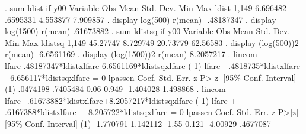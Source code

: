 . sum ldist if y00
{\smallskip}
    Variable {\VBAR}        Obs        Mean    Std. Dev.       Min        Max
       ldist {\VBAR}      1,149    6.696482    .6595331   4.553877   7.909857
{\smallskip}
. display log(500)-r(mean)
-.48187347
{\smallskip}
. display log(1500)-r(mean)
.61673882
{\smallskip}
. sum ldistsq if y00
{\smallskip}
    Variable {\VBAR}        Obs        Mean    Std. Dev.       Min        Max
     ldistsq {\VBAR}      1,149    45.27747    8.729749   20.73779   62.56583
{\smallskip}
. display (log(500)){\caret}2-r(mean)
-6.6561169
{\smallskip}
. display (log(1500)){\caret}2-r(mean)
8.2057217
{\smallskip}
. lincom lfare-.48187347*ldistxlfare-6.6561169*ldistsqxlfare
{\smallskip}
 ( 1)  lfare - .4818735*ldistxlfare - 6.656117*ldistsqxlfare = 0
{\smallskip}
     lpassen {\VBAR}      Coef.   Std. Err.      z    P>|z|     [95\% Conf. Interval]
         (1) {\VBAR}   .0474198   .7405484     0.06   0.949    -1.404028    1.498868
{\smallskip}
. lincom lfare+.61673882*ldistxlfare+8.2057217*ldistsqxlfare
{\smallskip}
 ( 1)  lfare + .6167388*ldistxlfare + 8.205722*ldistsqxlfare = 0
{\smallskip}
     lpassen {\VBAR}      Coef.   Std. Err.      z    P>|z|     [95\% Conf. Interval]
         (1) {\VBAR}  -1.770791   1.142112    -1.55   0.121     -4.00929    .4677087
{\smallskip}
